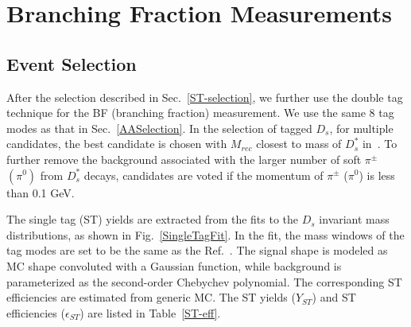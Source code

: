 \section{Branching Fraction Measurements}
\label{BFM}
\subsection{Event Selection}
\label{BFSelection}
After the selection described in Sec.~\ref{ST-selection}, we further use the double tag technique for the BF (branching fraction) measurement. 
We use the same 8 tag modes as that in Sec.~\ref{AASelection}.
In the selection of tagged $D_{s}$, for multiple candidates, the best candidate is chosen with $M_{rec}$ closest to mass of $D_{s}^{*}$ in~\cite{PDG2018}.
To further remove the background associated with the larger number of soft $\pi^{\pm}$ $(\pi^{0})$ from $D_{s}^{*}$ decays, candidates are voted if the momentum of $\pi^{\pm}$ ($\pi^{0}$) is less than 0.1 GeV.

The single tag (ST) yields are extracted from the fits to the $D_{s}$ invariant mass distributions, as shown in Fig.~\ref{SingleTagFit}. In the fit, the mass windows of the tag modes are set to be the same as the Ref.~\cite{Doc-DB-630-v35}.
The signal shape is modeled as MC shape convoluted with a Gaussian function, while background is parameterized as the second-order Chebychev polynomial.
The corresponding ST efficiencies are estimated from generic MC. The ST yields ($Y_{ST}$) and ST efficiencies ($\epsilon_{ST}$) are listed in Table~\ref{ST-eff}.

